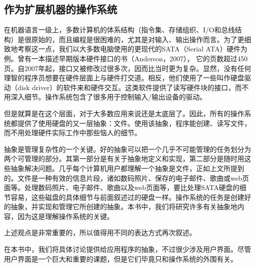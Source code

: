 \subsection{作为扩展机器的操作系统}
在机器语言一级上，多数计算机的体系结构（指令集、存储组织、I/O和总线结构）是很原始的，而且编程是很困难的，尤其是对输入、输出操作而言。为了更细致地考察这一点，我们以大多数电脑使用的更现代的SATA（Serial ATA）硬件为例。曾有一本描述早期版本硬件接口的书（Anderson，2007）， 它的页数超过450页。自2007年起，接口又被修改过很多次，因而比当时更为复杂。显然，没有任何理智的程序员想要在硬件层面上与硬件打交道。相反，他们使用了一些叫作硬盘驱动（disk driver）的软件来和硬件交互。这类软件提供了读写硬件块的接口，而不用深入细节。操作系统包含了很多用于控制输入/输出设备的驱动。
\par 但是就算是在这个层面，对于大多数应用来说还是太底层了。因此，所有的操作系统都提供了使用硬盘的又一层抽象：文件。使用该抽象，程序能创建、读写文件，而不用处理硬件实际工作中那些恼人的细节。
\par 抽象是管理复杂性的一个关键。好的抽象可以把一个几乎不可能管理的任务划分为两个可管理的部分。其第一部分是有关于抽象地定义和实现，第二部分是随时用这些抽象解决问题。几乎每个计算机用户都理解一个抽象是文件，正如上文所提到的。文件是一种有效的信息片段，诸如数码照片、保存的电子邮件、歌曲或web页面等。处理数码照片、电子邮件、歌曲以及web页面等，要比处理SATA硬盘的细节容易，这些磁盘的具体细节与前面叙述过的硬盘一样。操作系统的任务是创建好的抽象，并实现和管理它所创建的抽象。本书中，我们将研究许多有关抽象地内容，因为这是理解操作系统的关键。
\par 上述观点是非常重要的，所以值得用不同的表达方式再次叙述。
\par 在本书中，我们将具体讨论提供给应用程序的抽象，不过很少涉及用户界面。尽管用户界面是一个巨大和重要的课题，但是它们毕竟只和操作系统的外围有关。
